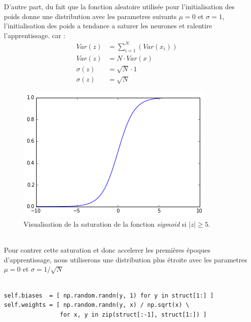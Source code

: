 \documentclass[11pt]{article}
\begin{document}
D'autre part, du fait que la fonction aleatoire utilis\'ee pour l'initialisation
des poids donne une distribution avec les parametres suivants $\mu=0$ et $\sigma=1$,
l'initialisation des poids a tendance a saturer les neurones et ralentire l'apprentissage.
car :
\begin{equation}
	\begin{aligned}
		Var(z) &= \sum_{i=1}^N(Var(x_i)) \\
		Var(z) &= N \cdot Var(x) \\
		\sigma(z) &= \sqrt{N} \cdot 1 \\
		\sigma(z) &= \sqrt{N}
	\end{aligned}
\end{equation}




\begin{figure}[htp]
	\centering
	\includegraphics[scale=.5]{img/sigmoid_sat.png}
	\caption{Visualisation de la saturation de la fonction \emph{sigmoid} si
	$|z| \ge 5$.}
\end{figure} \\

Pour contrer cette saturation et donc accelerer les premi\`eres \'epoques
d'apprentissage, nous utiliserons une distribution plus \'etroite avec les
parametres $\mu=0$ et $\sigma =1/\sqrt{N}$ \\


 \\
\begin{lstlisting}
self.biases  = [ np.random.randn(y, 1) for y in struct[1:] ]
self.weights = [ np.random.randn(y, x) / np.sqrt(x) \
				for x, y in zip(struct[:-1], struct[1:]) ]
\end{lstlisting}
\end{document}
